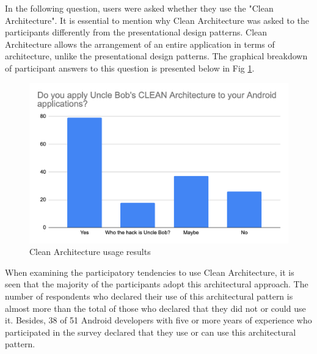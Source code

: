 In the following question, users were asked whether they use the "Clean Architecture". It is essential to mention why Clean Architecture was asked to the participants differently from the presentational design patterns. Clean Architecture allows the arrangement of an entire application in terms of architecture, unlike the presentational design patterns. The graphical breakdown of participant answers to this question is presented below in Fig \ref{fig:clean_arch}.
\begin{figure}[ht!]
    \centering
    \includegraphics[scale=0.33]{figures/survey_q4_clean_arch.png}
    \caption{Clean Architecture usage results}
    \label{fig:clean_arch}
\end{figure}
\FloatBarrier

When examining the participatory tendencies to use Clean Architecture, it is seen that the majority of the participants adopt this architectural approach. The number of respondents who declared their use of this architectural pattern is almost more than the total of those who declared that they did not or could use it. Besides, 38 of 51 Android developers with five or more years of experience who participated in the survey declared that they use or can use this architectural pattern.